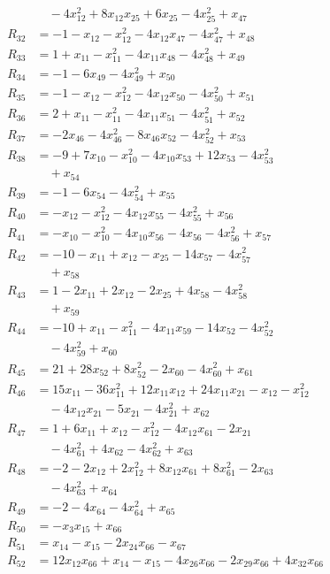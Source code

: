 \begin{align*}
&\quad{}-4x_{12}^{2}+8x_{12}x_{25}+6x_{25}-4x_{25}^{2}+x_{47}\\
R_{32}&=-1-x_{12}-x_{12}^{2}-4x_{12}x_{47}-4x_{47}^{2}+x_{48}\\
R_{33}&=1+x_{11}-x_{11}^{2}-4x_{11}x_{48}-4x_{48}^{2}+x_{49}\\
R_{34}&=-1-6x_{49}-4x_{49}^{2}+x_{50}\\
R_{35}&=-1-x_{12}-x_{12}^{2}-4x_{12}x_{50}-4x_{50}^{2}+x_{51}\\
R_{36}&=2+x_{11}-x_{11}^{2}-4x_{11}x_{51}-4x_{51}^{2}+x_{52}\\
R_{37}&=-2x_{46}-4x_{46}^{2}-8x_{46}x_{52}-4x_{52}^{2}+x_{53}\\
R_{38}&=-9+7x_{10}-x_{10}^{2}-4x_{10}x_{53}+12x_{53}-4x_{53}^{2}\\
&\quad{}+x_{54}\\
R_{39}&=-1-6x_{54}-4x_{54}^{2}+x_{55}\\
R_{40}&=-x_{12}-x_{12}^{2}-4x_{12}x_{55}-4x_{55}^{2}+x_{56}\\
R_{41}&=-x_{10}-x_{10}^{2}-4x_{10}x_{56}-4x_{56}-4x_{56}^{2}+x_{57}\\
R_{42}&=-10-x_{11}+x_{12}-x_{25}-14x_{57}-4x_{57}^{2}\\
&\quad{}+x_{58}\\
R_{43}&=1-2x_{11}+2x_{12}-2x_{25}+4x_{58}-4x_{58}^{2}\\
&\quad{}+x_{59}\\
R_{44}&=-10+x_{11}-x_{11}^{2}-4x_{11}x_{59}-14x_{52}-4x_{52}^{2}\\
&\quad{}-4x_{59}^{2}+x_{60}\\
R_{45}&=21+28x_{52}+8x_{52}^{2}-2x_{60}-4x_{60}^{2}+x_{61}\\
R_{46}&=15x_{11}-36x_{11}^{2}+12x_{11}x_{12}+24x_{11}x_{21}-x_{12}-x_{12}^{2}\\
&\quad{}-4x_{12}x_{21}-5x_{21}-4x_{21}^{2}+x_{62}\\
R_{47}&=1+6x_{11}+x_{12}-x_{12}^{2}-4x_{12}x_{61}-2x_{21}\\
&\quad{}-4x_{61}^{2}+4x_{62}-4x_{62}^{2}+x_{63}\\
R_{48}&=-2-2x_{12}+2x_{12}^{2}+8x_{12}x_{61}+8x_{61}^{2}-2x_{63}\\
&\quad{}-4x_{63}^{2}+x_{64}\\
R_{49}&=-2-4x_{64}-4x_{64}^{2}+x_{65}\\
R_{50}&=-x_{3}x_{15}+x_{66}\\
R_{51}&=x_{14}-x_{15}-2x_{24}x_{66}-x_{67}\\
R_{52}&=12x_{12}x_{66}+x_{14}-x_{15}-4x_{26}x_{66}-2x_{29}x_{66}+4x_{32}x_{66}\\

\end{align*}
